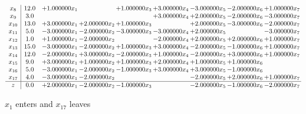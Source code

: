 \documentclass[10pt]{article}
\begin{document}
\[\begin{array}{c| c c@{\hskip 2pt} c@{\hskip 2pt} c@{\hskip 2pt} c@{\hskip 2pt} c@{\hskip 2pt} c@{\hskip 2pt} c@{\hskip 2pt} }
 x_{8}   &  12.0 & + 1.000000 x_{1} &   & + 1.000000 x_{3} & + 3.000000 x_{4} & -3.000000 x_{5} & -2.000000 x_{6} & + 1.000000 x_{7}\\
 x_{9}   &  3.0  &    &    &   & + 3.000000 x_{4} & + 2.000000 x_{5} & -2.000000 x_{6} & -3.000000 x_{7}\\
 x_{10}   &  13.0 & + 3.000000 x_{1} & + 2.000000 x_{2} & + 1.000000 x_{3} &   & + 2.000000 x_{5} & -3.000000 x_{6} & -2.000000 x_{7}\\
 x_{11}   &  5.0 & -3.000000 x_{1} & -2.000000 x_{2} & -3.000000 x_{3} & -3.000000 x_{4} & + 2.000000 x_{5} &   & -3.000000 x_{7}\\
 x_{12}   &  1.0 & + 1.000000 x_{1} & -2.000000 x_{2} &   & -2.000000 x_{4} & + 2.000000 x_{5} & + 2.000000 x_{6} & + 1.000000 x_{7}\\
 x_{13}   &  15.0 & -3.000000 x_{1} & -2.000000 x_{2} & + 1.000000 x_{3} & + 3.000000 x_{4} & -2.000000 x_{5} & -1.000000 x_{6} & + 1.000000 x_{7}\\
 x_{14}   &  12.0 & -2.000000 x_{1} & + 3.000000 x_{2} & -2.000000 x_{3} & + 1.000000 x_{4} & -2.000000 x_{5} & + 3.000000 x_{6} & + 1.000000 x_{7}\\
 x_{15}   &  9.0 & + 3.000000 x_{1} & + 1.000000 x_{2} & + 1.000000 x_{3} & + 2.000000 x_{4} & + 1.000000 x_{5} & + 1.000000 x_{6} &   \\
 x_{16}   &  5.0 & -3.000000 x_{1} & -2.000000 x_{2} & -1.000000 x_{3} & + 3.000000 x_{4} & + 3.000000 x_{5} & -1.000000 x_{6} &   \\
 x_{17}   &  4.0 & -3.000000 x_{1} & -2.000000 x_{2} &    &   & -2.000000 x_{5} & + 2.000000 x_{6} & + 1.000000 x_{7}\\
\hline
z    &  0.0 & + 2.000000 x_{1} & -2.000000 x_{2} & -1.000000 x_{3} &   & -2.000000 x_{5} & -1.000000 x_{6} & -2.000000 x_{7}\\
\end{array}\]


 $ x_{1} $ enters and $ x_{17} $ leaves 
\end{document}
